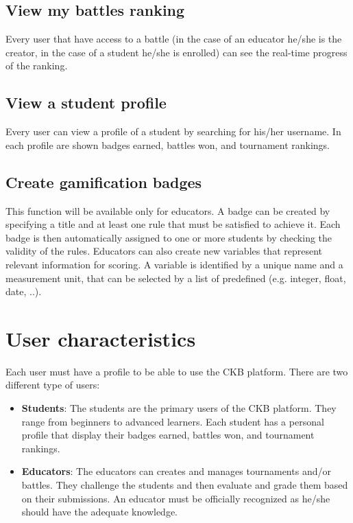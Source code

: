 \subsection{View my battles ranking}
Every user that have access to a battle (in the case of an educator he/she is the creator, in the case of a student he/she is enrolled) can see the real-time progress of the ranking. 

\subsection{View a student profile}
Every user can view a profile of a student by searching for his/her username. In each profile are shown badges earned, battles won, and tournament rankings. 

\subsection{Create gamification badges}
This function will be available only for educators. 
\newline A badge can be created by specifying a title and at least one rule that must be satisfied to achieve it. Each badge is then automatically assigned to one or more students by checking the validity of the rules. Educators can also create new variables that represent relevant information for scoring. A variable is identified by a unique name and a measurement unit, that can be selected by a list of predefined (e.g. integer, float, date, ..).

\clearpage

\section{User characteristics}
Each user must have a profile to be able to use the CKB platform.
There are two different type of users:
\begin{itemize}
	\item \textbf{Students}:
	    The students are the primary users of the CKB platform. They range from beginners to advanced learners. Each student has a personal profile that display their badges earned, battles won, and tournament rankings. 
	\item \textbf{Educators}: 
		The educators can creates and manages tournaments and/or battles. They challenge the students and then evaluate and grade them based on their submissions. An educator must be officially recognized as he/she should have the adequate knowledge.
\end{itemize}

